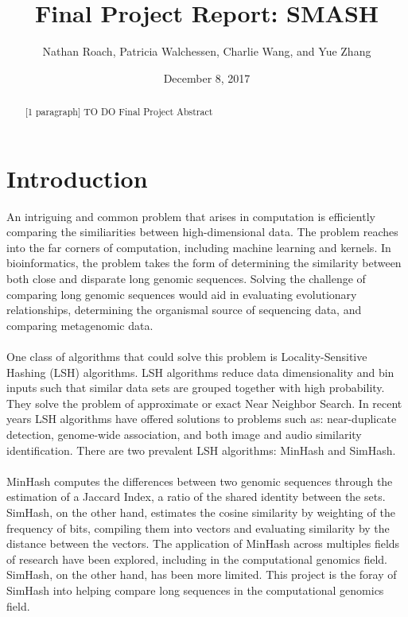 \documentclass[12pt, letterpaper]{article}
\title{Final Project Report: SMASH}
\author{Nathan Roach, Patricia Walchessen, Charlie Wang, and Yue Zhang}
\date{December 8, 2017}
\begin{document}
\maketitle
\begin{abstract}
	[1 paragraph] \color{red} TO DO \color{black} Final Project Abstract
\end{abstract}

\section{Introduction}
An intriguing and common problem that arises in computation is efficiently comparing the similiarities between high-dimensional data. The problem reaches into the far corners of computation, including machine learning and kernels. In bioinformatics, the problem takes the form of determining the similarity between both close and disparate long genomic sequences. Solving the challenge of comparing long genomic sequences would aid in evaluating evolutionary relationships, determining the organismal source of sequencing data, and comparing metagenomic data. \\ \\
One class of algorithms that could solve this problem is Locality-Sensitive Hashing (LSH) algorithms. LSH algorithms reduce data dimensionality and bin inputs such that similar data sets are grouped together with high probability. They solve the problem of approximate or exact Near Neighbor Search. In recent years LSH algorithms have offered solutions to problems such as: near-duplicate detection, genome-wide association, and both image and audio similarity identification. There are two prevalent LSH algorithms: MinHash and SimHash. \\ \\
MinHash computes the differences between two genomic sequences through the estimation of a Jaccard Index, a ratio of the  shared identity between the sets. SimHash, on the other hand, estimates the cosine similarity by weighting of the frequency of bits, compiling them into vectors and evaluating similarity by the distance between the vectors. The application of MinHash across multiples fields of research have been explored, including in the computational genomics field. SimHash, on the other hand, has been more limited. This project is the foray of SimHash into helping compare long sequences in the computational genomics field.
\end{document}
